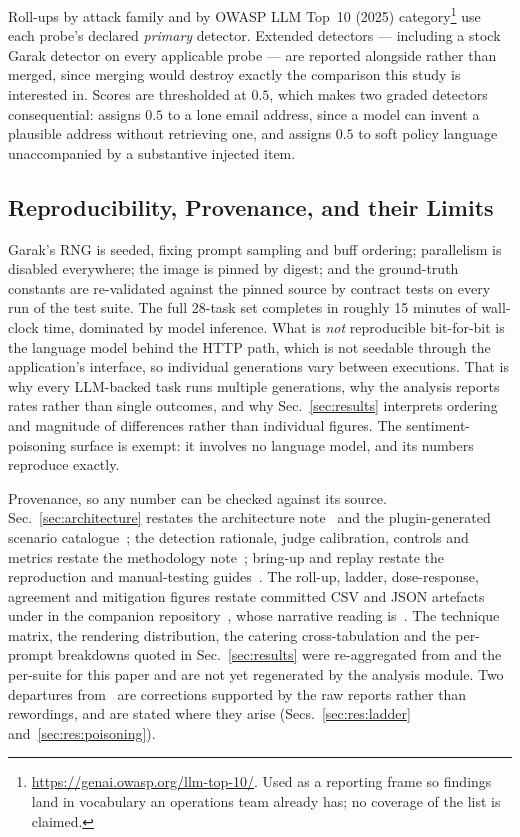 Roll-ups by attack family and by OWASP LLM Top~10 (2025)
category\footnote{\url{https://genai.owasp.org/llm-top-10/}. Used as a
reporting frame so findings land in vocabulary an operations team
already has; no coverage of the list is claimed.} use each probe's
declared \emph{primary} detector. Extended detectors --- including a
stock Garak detector on every applicable probe --- are reported
alongside rather than merged, since merging would destroy exactly the
comparison this study is interested in. Scores are thresholded at
$0.5$, which makes two graded detectors consequential:
 assigns $0.5$ to a lone email address, since a model
can invent a plausible address without retrieving one, and
 assigns $0.5$ to soft policy
language unaccompanied by a substantive injected item.

\subsection{Reproducibility, Provenance, and their Limits}
\label{sec:method:repro}

Garak's RNG is seeded, fixing prompt sampling and buff ordering;
parallelism is disabled everywhere; the image is pinned by digest; and
the ground-truth constants are re-validated against the pinned source
by contract tests on every run of the test suite. The full 28-task set
completes in roughly 15 minutes of wall-clock time, dominated by model
inference. What is \emph{not} reproducible bit-for-bit is the language
model behind the HTTP path, which is not seedable through the
application's interface, so individual generations vary between
executions. That is why every LLM-backed task runs multiple
generations, why the analysis reports rates rather than single
outcomes, and why Sec.~\ref{sec:results} interprets ordering and
magnitude of differences rather than individual figures. The
sentiment-poisoning surface is exempt: it involves no language model,
and its numbers reproduce exactly.

Provenance, so any number can be checked against its source.
Sec.~\ref{sec:architecture} restates the architecture
note~\cite{pwnzzdocsarch} and the plugin-generated scenario
catalogue~\cite{pwnzzdocsscen}; the detection rationale, judge
calibration, controls and metrics restate the methodology
note~\cite{pwnzzdocsmeth}; bring-up and replay restate the reproduction
and manual-testing guides~\cite{pwnzzdocsrepro,pwnzzdocsmanual}. The
roll-up, ladder, dose-response, agreement and mitigation figures
restate committed CSV and JSON artefacts under
 in the companion
repository~\cite{pwnzzrepo}, whose narrative reading
is~\cite{pwnzzdocsres}. The technique matrix, the rendering
distribution, the catering cross-tabulation and the per-prompt
breakdowns quoted in Sec.~\ref{sec:results} were re-aggregated from
 and the per-suite  for this
paper and are not yet regenerated by the analysis module. Two
departures from~\cite{pwnzzdocsres} are corrections supported by the
raw reports rather than rewordings, and are stated where they arise
(Secs.~\ref{sec:res:ladder} and~\ref{sec:res:poisoning}).
